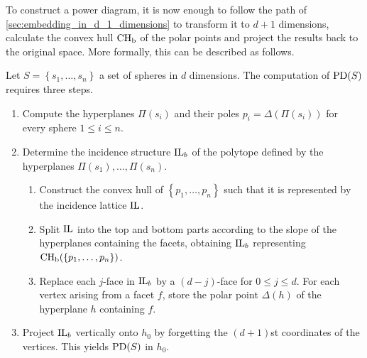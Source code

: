 To construct a power diagram, it is now enough to follow the path of \cref{sec:embedding_in_d_1_dimensions} to transform it to $d+1$ dimensions, calculate the convex hull $\operatorname{CH_b}$ of the polar points and project the results back to the original space.
More formally, this can be described as follows.

\begin{algorithm}
    \label{alg:embedding}
    Let $S = \left\{ s_1, \dots, s_n \right\}$ a set of spheres in $d$ dimensions.
    The computation of $\operatorname{PD}(S)$ requires three steps.
    \begin{enumerate}[label=Step \arabic*.,ref=Step \arabic*,leftmargin=5em]
        \item \label{alg:pd:step1} Compute the hyperplanes $\Pi(s_i)$ and their poles $p_i = \Delta(\Pi(s_i))$ for every sphere $1 \leq i \leq n$.
        \item \label{alg:pd:step2} Determine the incidence structure $\operatorname{IL}_b$ of the polytope defined by the hyperplanes $\Pi(s_1), \dots, \Pi(s_n)$.
            \begin{enumerate}[label*=\arabic*.,ref=\theenumi.\arabic*]
                \item \label{alg:pd:step21} Construct the convex hull of $\left\{ p_1, \dots, p_n \right\}$ such that it is represented by the incidence lattice $\operatorname{IL}$.
                \item \label{alg:pd:step22} Split $\operatorname{IL}$ into the top and bottom parts according to the slope of the hyperplanes containing the facets, obtaining $\operatorname{IL}_b$ representing $\operatorname{CH_b}(\left\{ p_1, \dots, p_n \right\})$.
                \item \label{alg:pd:step23} Replace each $j$-face in $\operatorname{IL}_b$ by a $(d - j)$-face for $0 \leq j \leq d$. For each vertex arising from a facet $f$, store the polar point $\Delta(h)$ of the hyperplane $h$ containing $f$.
            \end{enumerate}
        \item \label{alg:pd:step3} Project $\operatorname{IL}_b$ vertically onto $h_0$ by forgetting the $(d+1)$st coordinates of the vertices. This yields $\operatorname{PD}(S)$ in $h_0$.
    \end{enumerate}
\end{algorithm}


